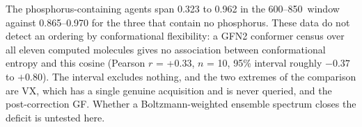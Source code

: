 \begin{table}[htbp]
\centering
\caption{Measured-to-computed cosine by region for every queried agent. Bold entries are the 600--850\,\wn{} window of the phosphorus-containing agents.}
\label{tab:si-regbyagent}
\footnotesize
{}

\begin{flushleft}\footnotesize The phosphorus-containing agents span 0.323 to 0.962 in the 600--850\,\wn{} window against 0.865--0.970 for the three that contain no phosphorus. These data do not detect an ordering by conformational flexibility: a GFN2 conformer census over all eleven computed molecules gives no association between conformational entropy and this cosine (Pearson $r$ = +0.33, $n$ = 10, 95\% interval roughly $-0.37$ to $+0.80$). The interval excludes nothing, and the two extremes of the comparison are VX, which has a single genuine acquisition and is never queried, and the post-correction GF. Whether a Boltzmann-weighted ensemble spectrum closes the deficit is untested here.\end{flushleft}
\end{table}
